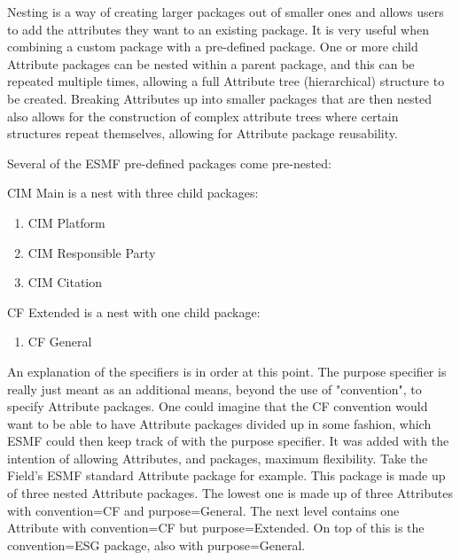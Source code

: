 %


\label{desc:AttPacksNesting}


Nesting is a way of creating larger packages out of smaller ones and allows users to add the attributes they want to an existing package. It is very useful when combining a custom package with a pre-defined package. One or more child Attribute packages can be nested within a parent package, and this can be repeated multiple times, allowing a full Attribute tree (hierarchical) structure to be created.  Breaking Attributes up into smaller packages that are then nested also allows for the construction of complex attribute trees where certain structures repeat themselves, allowing for Attribute package reusability.


Several of the ESMF pre-defined packages come pre-nested:

CIM Main is a nest with three child packages:
\begin{enumerate}
   \item CIM Platform
   \item CIM Responsible Party
   \item CIM Citation
\end{enumerate}

CF Extended is a nest with one child package:

\begin{enumerate}
   \item CF General
\end{enumerate}

An explanation of the specifiers is in order at this point.  The purpose 
specifier is really just meant as an additional means, beyond the use of 
"convention", to specify Attribute packages.  One could imagine that the 
CF convention would want to be able to have Attribute packages divided 
up in some fashion, which ESMF could then keep track of with the purpose 
specifier.  It was added with the intention of allowing Attributes, and 
packages, maximum flexibility.  Take the Field's ESMF standard Attribute 
package for example.  This package is made up of three nested Attribute 
packages.  The lowest one is made up of three Attributes with convention=CF 
and purpose=General.  The next level contains one Attribute with convention=CF 
but purpose=Extended.  On top of this is the convention=ESG package, also 
with purpose=General.
